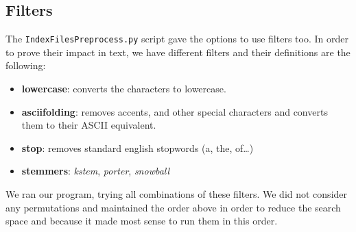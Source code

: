 \subsection{Filters}

The \texttt{IndexFilesPreprocess.py} script gave the options to use filters too. In order to prove their impact in text, we have different filters and their definitions are the following:
\begin{itemize}
    \item \textbf{lowercase}: converts the characters to lowercase.
    \item \textbf{asciifolding}: removes accents, and other special characters and converts them to their ASCII equivalent.
    \item \textbf{stop}:  removes standard english stopwords (a, the, of\dots)
    \item \textbf{stemmers}: \emph{kstem}, \emph{porter}, \emph{snowball}
\end{itemize}

We ran our program, trying all combinations of these filters. We did not consider any permutations and maintained
the order above in order to reduce the search space and because it made most sense to run them in this
order.

